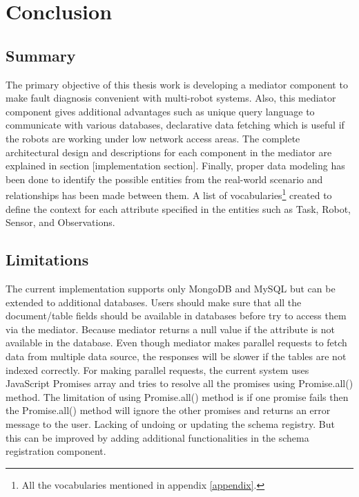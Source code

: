 

	\let\cleardoublepage\clearpage
\chapter{Conclusion} \label{sec:conclusion}

\section{Summary}

The primary objective of this thesis work is developing a mediator component to make fault diagnosis convenient with multi-robot systems. Also, this mediator component gives additional advantages such as unique query language to communicate with various databases, declarative data fetching which is useful if the robots are working under low network access areas. The complete architectural design and descriptions for each component in the mediator are explained in section [implementation section]. Finally, proper data modeling has been done to identify the possible entities from the real-world scenario and relationships has been made between them. A list of vocabularies\footnote{All the vocabularies mentioned in appendix \ref{appendix}.} created to define the context for each attribute specified in the entities such as Task, Robot, Sensor, and Observations.

\section{Limitations}

The current implementation supports only MongoDB and MySQL but can be extended to additional databases. Users should make sure that all the document/table fields should be available in databases before try to access them via the mediator. Because mediator returns a null value if the attribute is not available in the database. Even though mediator makes parallel requests to fetch data from multiple data source, the responses will be slower if the tables are not indexed correctly. For making parallel requests, the current system uses JavaScript Promises array and tries to resolve all the promises using Promise.all() method. The limitation of using Promise.all() method is if one promise fails then the Promise.all() method will ignore the other promises and returns an error message to the user. Lacking of undoing or updating the schema registry. But this can be improved by adding additional functionalities in the schema registration component.

